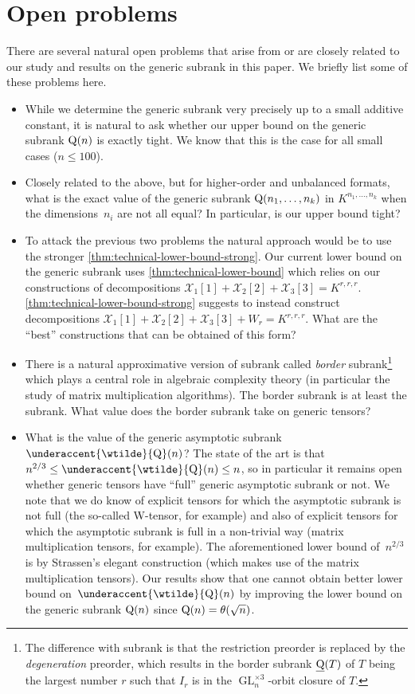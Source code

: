 \documentclass[11pt]{article}
\theoremstyle{definition}
\theoremstyle{remark}
\newcommand{\bsubrank}{{\underline{\rm Q}}}
\newcommand{\gensubrank}{{\rm Q}}
\newcommand{\GL}{\operatorname{GL}}
\DeclareMathOperator{\asympsubrank}{\underaccent{\wtilde}{Q}}
\begin{document}
\section{Open problems}\label{sec:open-problems}

There are several natural open problems that arise from or are closely related to our study and results on the generic subrank in this paper. We briefly list some of these problems here.

\begin{itemize}
    \item While we determine the generic subrank very precisely up to a small additive constant, it is natural to ask whether our upper bound on the generic subrank $\gensubrank(n)$ is exactly tight. We know that this is the case for all small cases ($n \leq 100$). 
    \item Closely related to the above, but for higher-order and unbalanced formats, what is the exact value of the generic subrank $\gensubrank(n_1,\ldots,n_k)$ in $K^{n_1,\ldots, n_k}$ when the dimensions~$n_i$ are not all equal? In particular, is our upper bound tight?
    \item To attack the previous two problems the natural approach would be to use the stronger 
    \autoref{thm:technical-lower-bound-strong}.
    Our current lower bound on the generic subrank uses \autoref{thm:technical-lower-bound} which relies on our constructions of decompositions $\mathcal{X}_1[1] + \mathcal{X}_2[2] + \mathcal{X}_3[3] = K^{r,r,r}$.  \autoref{thm:technical-lower-bound-strong} suggests to instead construct decompositions $\mathcal{X}_1[1] + \mathcal{X}_2[2] + \mathcal{X}_3[3] + W_r = K^{r,r,r}$. What are the ``best'' constructions that can be obtained of this form?
    \item There is a natural approximative version of subrank called \emph{border} subrank\footnote{The difference with subrank is that the restriction preorder is replaced by the \emph{degeneration} preorder, which results in the border subrank $\bsubrank(T)$ of $T$ being the largest number $r$ such that $I_r$ is in the $\GL_n^{\times3}$-orbit closure of $T$.} which plays a central role in algebraic complexity theory (in particular the study of matrix multiplication algorithms).
    The border subrank is at least the subrank. What value 
    does the border subrank take on generic tensors?
    \item What is the value of the generic asymptotic subrank $\asympsubrank(n)$? The state of the art is that $n^{2/3} \leq \asympsubrank(n) \leq n$, so in particular it remains open whether generic tensors have ``full'' generic asymptotic subrank or not. We note that we do know of explicit tensors for which the asymptotic subrank is not full (the so-called W-tensor, for example) and also of explicit tensors for which the asymptotic subrank is full in a non-trivial way (matrix multiplication tensors, for example). The aforementioned lower bound of~$n^{2/3}$ is by Strassen's elegant construction (which makes use of the matrix multiplication tensors). Our results show that one cannot obtain better lower bound on~$\asympsubrank(n)$ by improving the lower bound on the generic subrank $\gensubrank(n)$ since $\gensubrank(n) = \theta(\sqrt{n})$.

\end{itemize}
\end{document}
